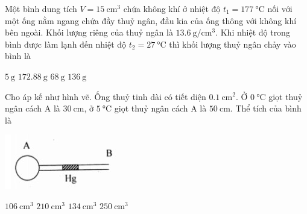 \begin{ex}
	Một bình dung tích $V=\SI{15}{\centi\meter^3}$ chứa không khí ở nhiệt độ $t_1=\SI{177}{\celsius}$ nối với một ống nằm ngang chứa đầy thuỷ ngân, đầu kia của ống thông với không khí bên ngoài. Khối lượng riêng của thuỷ ngân là $\SI{13.6}{\gram/\centi\meter^3}$. Khi nhiệt độ trong bình được làm lạnh đến nhiệt độ $t_2=\SI{27}{\celsius}$ thì khối lượng thuỷ ngân chảy vào bình là
	
	\choice
	{$\SI{5}{\gram}$}
	{$\SI{172.88}{\gram}$}
	{\True $\SI{68}{\gram}$}
	{$\SI{136}{\gram}$}
\end{ex}
\begin{ex}
	Cho áp kế như hình vẽ. Ống thuỷ tinh dài có tiết diện $\SI{0.1}{\centi\meter^2}$. Ở $\SI{0}{\celsius}$ giọt thuỷ ngân cách A là $\SI{30}{\centi\meter}$, ở $\SI{5}{\celsius}$ giọt thuỷ ngân cách A là $\SI{50}{\centi\meter}$. Thể tích của bình là
	\begin{center}
		\includegraphics[width=0.2\linewidth]{figs/VN12-Y24-PH-SYL-011P-2}
	\end{center}

	\choice
	{\True $\SI{106}{\centi\meter^3}$}
	{$\SI{210}{\centi\meter^3}$}
	{$\SI{134}{\centi\meter^3}$}
	{$\SI{250}{\centi\meter^3}$}
\end{ex}
